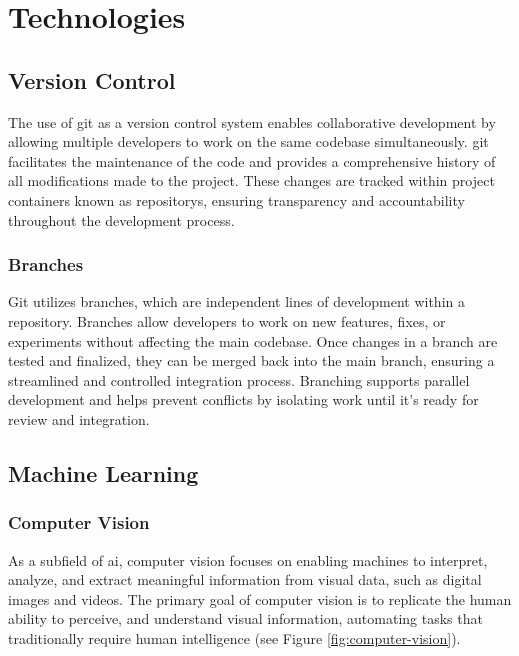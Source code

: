 \section{Technologies}
\label{sec:technologies}

\subsection{Version Control}
\label{subsec:version-control}

The use of \gls{git} as a version control system enables collaborative development by allowing multiple developers to work on the same codebase simultaneously. \gls{git} facilitates the maintenance of the code and provides a comprehensive history of all modifications made to the project. These changes are tracked within project containers known as \glspl{repository}, ensuring transparency and accountability throughout the development process. \cite{alphaefficiency:git}

\subsubsection*{Branches}

Git utilizes branches, which are independent lines of development within a repository. Branches allow developers to work on new features, fixes, or experiments without affecting the main codebase. Once changes in a branch are tested and finalized, they can be merged back into the main branch, ensuring a streamlined and controlled integration process. Branching supports parallel development and helps prevent conflicts by isolating work until it's ready for review and integration. \cite{git:branches}

\subsection{Machine Learning}
\label{sec:machine-learning}

\subsubsection*{Computer Vision}
\label{subsubsec:computer-vision}

As a subfield of \gls{ai}, computer vision focuses on enabling machines to interpret, analyze, and extract meaningful information from visual data, such as digital images and videos. The primary goal of computer vision is to replicate the human ability to perceive, and understand visual information, automating tasks that traditionally require human intelligence (see Figure \ref{fig:computer-vision}). \cite{google:vision, microsoft:vision}

